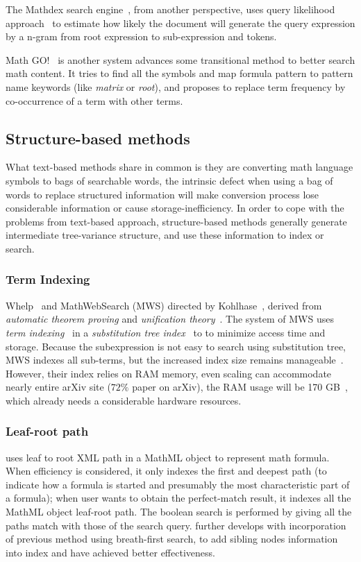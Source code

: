 The Mathdex search engine~\cite{queryf_datan07}, from another perspective, uses query likelihood approach~\cite{iir} to estimate how likely the document will generate the query expression by a n-gram from root expression to sub-expression and tokens.

Math GO!~\cite{Adeel_mathgo} is another system advances some transitional method to better search math content. It tries to find all the symbols and map formula pattern to pattern name keywords (like \textit{matrix} or \textit{root}), and proposes to replace term frequency by co-occurrence of a term with other terms.

\subsection{Structure-based methods}
What text-based methods share in common is they are converting math language symbols to bags of searchable words, the intrinsic defect when using a bag of words to replace structured information will make conversion process lose considerable information or cause storage-inefficiency.
In order to cope with the problems from text-based approach, structure-based methods generally generate intermediate tree-variance structure, and use these information to index or search.

\subsubsection*{Term Indexing}
Whelp~\cite{whelp04} and MathWebSearch (MWS) directed by Kohlhase~\cite{Kohlhase06,Kohlhase0p4,Kohlhase0p5}, derived from \textit{automatic theorem proving} and \textit{unification theory}~\cite{AIbook}. The system of MWS uses \textit{term indexing}~\cite{graf96} in a \textit{substitution tree index}~\cite{graf96} to to minimize access time and storage. Because the subexpression is not easy to search using substitution tree, MWS indexes all sub-terms, but the increased index size remains manageable~\cite{Kohlhase06}. However, their index relies on RAM memory, even scaling can accommodate nearly entire arXiv site ($72\%$ paper on arXiv), the RAM usage will be 170 GB~\cite{Kohlhase0p5}, which already needs a considerable hardware resources.

\subsubsection*{Leaf-root path}
\label{leafrootmethod}
\cite{MathMLleafroot} uses leaf to root XML path in a MathML object to represent math formula. When efficiency is considered, it only indexes the first and deepest path (to indicate how a formula is started and presumably the most characteristic part of a formula); 
when user wants to obtain the perfect-match result, it indexes all the MathML object leaf-root path. The boolean search is performed by giving all the paths match with those of the search query. 
\cite{sefobyfo} further develops with incorporation of previous method using breath-first search, to add sibling nodes information into index and have achieved better effectiveness.

